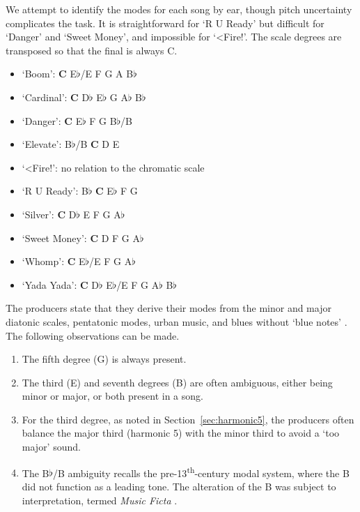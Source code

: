 \documentclass{article}
\begin{document}
We attempt to identify the modes for each song by ear, though pitch uncertainty complicates the task. It is straightforward for `R U Ready' but difficult for `Danger' and `Sweet Money', and impossible for `<Fire!'. The scale degrees are transposed so that the final is always C.

\begin{itemize}[noitemsep]
	\item `Boom': \textbf{C} E$\flat$/E F G A B$\flat$ 
	\item `Cardinal': \textbf{C} D$\flat$ E$\flat$ G A$\flat$ B$\flat$
	\item `Danger': \textbf{C} E$\flat$ F G B$\flat$/B 
	\item `Elevate': B$\flat$/B \textbf{C} D E
	\item `<Fire!': no relation to the chromatic scale
        \item `R U Ready': B$\flat$ \textbf{C} E$\flat$ F G
	\item `Silver': \textbf{C} D$\flat$ E F G A$\flat$
	\item `Sweet Money': \textbf{C} D F G A$\flat$
	\item `Whomp': \textbf{C} E$\flat$/E F G A$\flat$
	\item `Yada Yada':  \textbf{C} D$\flat$ E$\flat$/E F G A$\flat$ B$\flat$
\end{itemize}

The producers state that they derive their modes from the minor and major diatonic scales, pentatonic modes, urban music, and blues without `blue notes' \citep{kubik2001bluenote}. The following observations can be made.

\begin{enumerate}[noitemsep]
    \item The fifth degree (G) is always present.
    \item The third (E) and seventh degrees (B) are often ambiguous, either being minor or major, or both present in a song.
    \item For the third degree, as noted in Section~\ref{sec:harmonic5}, the producers often balance the major third (harmonic 5) with the minor third to avoid a `too major' sound.
    \item The B$\flat$/B ambiguity recalls the pre-13\textsuperscript{th}-century modal system, where the B did not function as a leading tone. The alteration of the B was subject to interpretation, termed \emph{Music Ficta} \citep{bent2001MusicaFicta}.
\end{enumerate}
\end{document}
